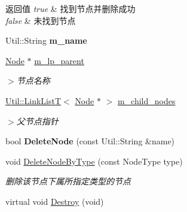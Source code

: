 \begin{DoxyRetVals}{返回值}
{\em true} & 找到节点并删除成功 \\
\hline
{\em false} & 未找到节点 \\
\hline
\end{DoxyRetVals}
\begin{DoxyCompactItemize}
\item 
\hypertarget{class_file_sys_1_1_node_a982da8b0cc8f6f12d9b6fcea6890cade}{Util\-::\-String {\bfseries m\-\_\-name}}\label{class_file_sys_1_1_node_a982da8b0cc8f6f12d9b6fcea6890cade}

\item 
\hypertarget{class_file_sys_1_1_node_afef8b39b75789040417847af5efedbda}{\hyperlink{class_file_sys_1_1_node}{Node} $\ast$ \hyperlink{class_file_sys_1_1_node_afef8b39b75789040417847af5efedbda}{m\-\_\-lp\-\_\-parent}}\label{class_file_sys_1_1_node_afef8b39b75789040417847af5efedbda}

\begin{DoxyCompactList}\small\item\em $>$节点名称 \end{DoxyCompactList}\item 
\hypertarget{class_file_sys_1_1_node_a94704313dc4313ddde51129c73ec16c4}{\hyperlink{class_util_1_1_link_list_t}{Util\-::\-Link\-List\-T}$<$ \hyperlink{class_file_sys_1_1_node}{Node} $\ast$ $>$ \hyperlink{class_file_sys_1_1_node_a94704313dc4313ddde51129c73ec16c4}{m\-\_\-child\-\_\-nodes}}\label{class_file_sys_1_1_node_a94704313dc4313ddde51129c73ec16c4}

\begin{DoxyCompactList}\small\item\em $>$父节点指针 \end{DoxyCompactList}\item 
\hypertarget{class_file_sys_1_1_node_a4fcc133baeb1f8213fc5e886c40739da}{bool {\bfseries Delete\-Node} (const Util\-::\-String \&name)}\label{class_file_sys_1_1_node_a4fcc133baeb1f8213fc5e886c40739da}

\item 
\hypertarget{class_file_sys_1_1_node_a3366c9b2f3d63d629326eb65ef8ab6b2}{void \hyperlink{class_file_sys_1_1_node_a3366c9b2f3d63d629326eb65ef8ab6b2}{Delete\-Node\-By\-Type} (const Node\-Type type)}\label{class_file_sys_1_1_node_a3366c9b2f3d63d629326eb65ef8ab6b2}

\begin{DoxyCompactList}\small\item\em 删除该节点下属所指定类型的节点 \end{DoxyCompactList}\item 
\hypertarget{class_file_sys_1_1_node_ae6d82979ab6cc2fb80c04341cff5f88c}{virtual void \hyperlink{class_file_sys_1_1_node_ae6d82979ab6cc2fb80c04341cff5f88c}{Destroy} (void)}\label{class_file_sys_1_1_node_ae6d82979ab6cc2fb80c04341cff5f88c}


\end{DoxyCompactItemize}
